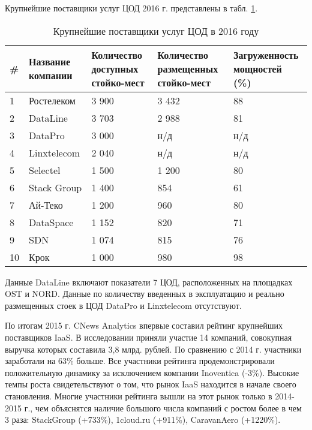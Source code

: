 Крупнейшие поставщики услуг ЦОД 2016 г. \cite{cnews} представлены в табл. \ref{dc-table}.
\begin{table}[H]
  \caption{Крупнейшие поставщики услуг ЦОД в 2016 году}\label{dc-table}
  \begin{tabular}{|p{0.6cm}|p{2.6cm}|p{3cm}|p{3.5cm}|p{3.5cm}|}
  \hline \# & Название компании & Количество доступных стойко-мест & Количество размещенных стойко-мест & Загруженность мощностей (\%) \\
  \hline 1 & Ростелеком & 3 900 & 3 432 & 88 \\
  \hline 2 & DataLine & 3 703 & 2 988 & 81 \\
  \hline 3 & DataPro & 3 000 & н/д & н/д \\
  \hline 4 & Linxtelecom & 2 040 & н/д & н/д \\
  \hline 5 & Selectel & 1 500 & 1 200 & 80 \\
  \hline 6 & Stack Group & 1 400 & 854 & 61 \\
  \hline 7 & Ай-Теко & 1 200 & 960 & 80 \\
  \hline 8 & DataSpace & 1 152 & 820 & 71 \\
  \hline 9 & SDN & 1 074 & 815 & 76 \\
  \hline 10 & Крок & 1 000 & 980 & 98 \\
  \hline
  \end{tabular}
\end{table}

Данные DataLine включают показатели 7 ЦОД, расположенных на площадках OST и NORD.
Данные по количеству введенных в эксплуатацию и реально размещенных стоек в ЦОД DataPro и Linxtelecom отсутствуют.

По итогам 2015 г. CNews Analytics впервые составил рейтинг крупнейших поставщиков IaaS.
В исследовании приняли участие 14 компаний, совокупная выручка которых составила 3,8 млрд. рублей.
По сравнению с 2014 г. участники заработали на 63\% больше.
Все участники рейтинга продемонстрировали положительную динамику за исключением компании Inoventica (-3\%).
Высокие темпы роста свидетельствуют о том, что рынок IaaS находится в начале своего становления.
Многие участники рейтинга вышли на этот рынок только в 2014-2015 г., чем объяснятся наличие большого числа компаний с ростом более в чем 3 раза: StackGroup (+733\%), 1cloud.ru (+911\%), CaravanAero (+1220\%).

